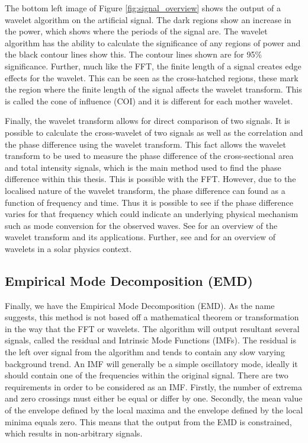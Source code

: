     The bottom left image of Figure \ref{fig:signal_overview} shows the output of a wavelet algorithm on the artificial signal.
    The dark regions show an increase in the power, which shows where the periods of the signal are.
    The wavelet algorithm has the ability to calculate the significance of any regions of power and the black contour lines show this.
    The contour lines shown are for 95\% significance. 
    Further, much like the FFT, the finite length of a signal creates edge effects for the wavelet.
    This can be seen as the cross-hatched regions, these mark the region where the finite length of the signal affects the wavelet transform.
    This is called the cone of influence (COI) and it is different for each mother wavelet.
    
    Finally, the wavelet transform allows for direct comparison of two signals.
    It is possible to calculate the cross-wavelet of two signals as well as the correlation and the phase difference using the wavelet transform.
    This fact allows the wavelet transform to be used to measure the phase difference of the cross-sectional area and total intensity signals, which is the main method used to find the phase difference within this thesis.
    This is possible with the FFT. 
    However, due to the localised nature of the wavelet transform, the phase difference can found as  a function of frequency and time.
    Thus it is possible to see if the phase difference varies for that frequency which could indicate an underlying physical mechanism such as mode conversion for the observed waves.
    See \cite{torrence} for an overview of the wavelet transform and its applications.
    Further, see \cite{2004SoPh..222..203D} and \cite{WAUO} for an overview of wavelets in a solar physics context.
    
\subsection{Empirical Mode Decomposition (EMD)}

	Finally, we have the Empirical Mode Decomposition (EMD).
	As the name suggests, this method is not based off a mathematical theorem or transformation in the way that the FFT or wavelets.
    The algorithm will output resultant several signals, called the residual and Intrinsic Mode Functions (IMFs).
    The residual is the left over signal from the algorithm and tends to contain any slow varying background trend.
    An IMF will generally be a simple oscillatory mode, ideally it should contain one of the frequencies within the original signal.
    There are two requirements in order to be considered as an IMF.
    Firstly, the number of extrema and zero crossings must either be equal or differ by one.
    Secondly, the mean value of the envelope defined by the local maxima and the envelope defined by the local minima equals zero.
    This means that the output from the EMD is constrained, which results in non-arbitrary signals.
    
